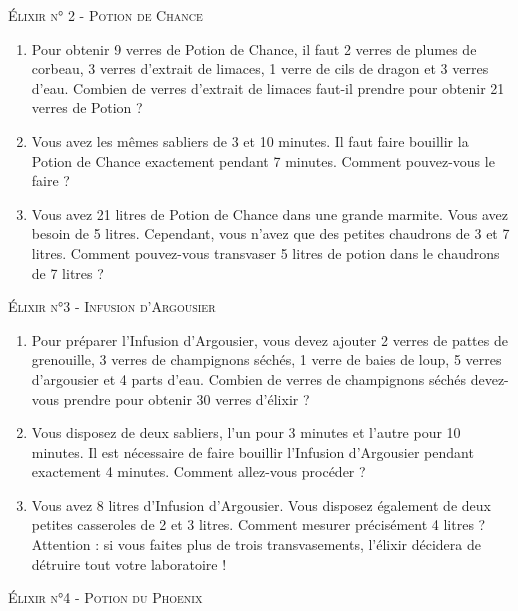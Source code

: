 \documentclass{article}
\begin{document}
\vspace{1ex}
\begin{center}\textsc{\Large{Élixir n° 2 - Potion de Chance}}\end{center}
\begin{enumerate}
	\item
		Pour obtenir 9 verres de Potion de Chance, il faut 2 verres de plumes
		de corbeau, 3 verres d'extrait de limaces, 1 verre de cils de dragon et
		3 verres d'eau. Combien de verres d'extrait de limaces faut-il prendre
		pour obtenir 21 verres de Potion ?
	\item
		Vous avez les mêmes sabliers de 3 et 10 minutes. Il faut faire bouillir
		la Potion de Chance exactement pendant 7 minutes. Comment pouvez-vous
		le faire ?
	\item
		Vous avez 21 litres de Potion de Chance dans une grande marmite. Vous
		avez besoin de 5 litres. Cependant, vous n'avez que des petites 
		chaudrons de 3 et 7 litres. Comment pouvez-vous transvaser 5 litres de
		potion dans le chaudrons de 7 litres ?
\end{enumerate}
\vspace{1ex}
\begin{center}\textsc{\Large{Élixir n°3 - Infusion d'Argousier}}\end{center}
\begin{enumerate}
	\item
		Pour préparer l'Infusion d'Argousier, vous devez ajouter 2 verres de
		pattes de grenouille, 3 verres de champignons séchés, 1 verre de baies
		de loup, 5 verres d'argousier et 4 parts d'eau. Combien de verres de
		champignons séchés devez-vous prendre pour obtenir 30 verres d'élixir ?
	\item
		Vous disposez de deux sabliers, l'un pour 3 minutes et l'autre pour 10
		minutes. Il est nécessaire de faire bouillir l'Infusion d'Argousier
		pendant exactement 4 minutes. Comment allez-vous procéder ?
	\item
		Vous avez 8 litres d'Infusion d'Argousier. Vous disposez également de
		deux petites casseroles de 2 et 3 litres. Comment mesurer précisément 4
		litres ? Attention : si vous faites plus de trois transvasements,
		l'élixir décidera de détruire tout votre laboratoire !
\end{enumerate}
\vspace{1ex}
\begin{center}\textsc{\Large{Élixir n°4 - Potion du Phoenix}}\end{center}
\end{document}
